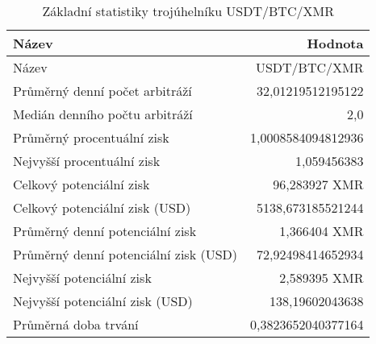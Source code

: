 \begin{table}\centering
\caption{Základní statistiky trojúhelníku USDT/BTC/XMR}
\label{USDTBTCXMR_stats}
\begin{tabular}{|| l | r ||}
\hline Název & Hodnota \\ 
\hline\hline Název & USDT/BTC/XMR \\ 
\hline Průměrný denní počet arbitráží & 32,01219512195122 \\ 
\hline Medián denního počtu arbitráží & 2,0 \\ 
\hline Průměrný procentuální zisk & 1,0008584094812936 \\ 
\hline Nejvyšší procentuální zisk & 1,059456383 \\ 
\hline Celkový potenciální zisk & 96,283927 XMR \\ 
\hline Celkový potenciální zisk (USD) & 5138,673185521244 \\ 
\hline Průměrný denní potenciální zisk & 1,366404 XMR \\ 
\hline Průměrný denní potenciální zisk (USD) & 72,92498414652934 \\ 
\hline Nejvyšší potenciální zisk & 2,589395 XMR \\ 
\hline Nejvyšší potenciální zisk (USD) & 138,19602043638 \\ 
\hline Průměrná doba trvání & 0,3823652040377164 \\ 
\hline
\end{tabular}
\end{table}